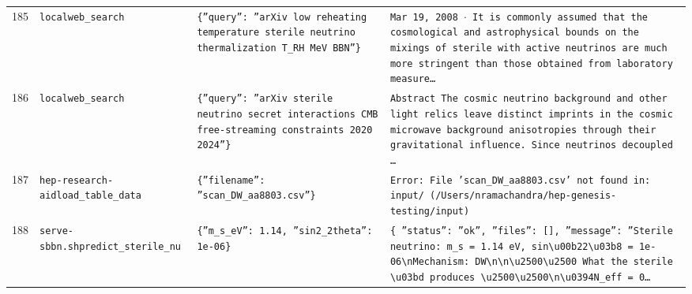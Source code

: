 \documentclass[11pt,a4paper]{article}
\begin{document}
\begin{longtable}{@{}p{}p{}p{}p{}@{}}
185 & \texttt{local}\newline\texttt{web\_\allowbreak{}search} & \texttt{\{''query'':\allowbreak{} ''arXiv low reheating temperature sterile neutrino thermalization T\_\allowbreak{}RH MeV BBN''\}\allowbreak{}} & \texttt{Mar 19,\allowbreak{} 2008 $\cdot$ It is commonly assumed that the cosmological and astrophysical bounds on the mixings of sterile with active neutrinos are much more stringent than those obtained from laboratory measure\ldots{}\allowbreak{}} \\
186 & \texttt{local}\newline\texttt{web\_\allowbreak{}search} & \texttt{\{''query'':\allowbreak{} ''arXiv sterile neutrino secret interactions CMB free-streaming constraints 2020 2024''\}\allowbreak{}} & \texttt{Abstract The cosmic neutrino background and other light relics leave distinct imprints in the cosmic microwave background anisotropies through their gravitational influence. Since neutrinos decoupled \ldots{}\allowbreak{}} \\
187 & \texttt{hep-research-aid}\newline\texttt{load\_\allowbreak{}table\_\allowbreak{}data} & \texttt{\{''filename'':\allowbreak{} ''scan\_\allowbreak{}DW\_\allowbreak{}aa8803.csv''\}\allowbreak{}} & \texttt{Error:\allowbreak{} File 'scan\_\allowbreak{}DW\_\allowbreak{}aa8803.csv' not found in:\allowbreak{} input/\allowbreak{} (/\allowbreak{}Users/\allowbreak{}nramachandra/\allowbreak{}hep-genesis-testing/\allowbreak{}input)\allowbreak{}} \\
188 & \texttt{serve-sbbn.sh}\newline\texttt{predict\_\allowbreak{}sterile\_\allowbreak{}nu} & \texttt{\{''m\_\allowbreak{}s\_\allowbreak{}eV'':\allowbreak{} 1.14,\allowbreak{} ''sin2\_\allowbreak{}2theta'':\allowbreak{} 1e-06\}\allowbreak{}} & \texttt{\{   ''status'':\allowbreak{} ''ok'',\allowbreak{}   ''files'':\allowbreak{} []\allowbreak{},\allowbreak{}   ''message'':\allowbreak{} ''Sterile neutrino:\allowbreak{} m\_\allowbreak{}s =\allowbreak{} 1.14 eV,\allowbreak{} sin\textbackslash{}\allowbreak{}u00b22\textbackslash{}\allowbreak{}u03b8 =\allowbreak{} 1e-06\textbackslash{}\allowbreak{}nMechanism:\allowbreak{} DW\textbackslash{}\allowbreak{}n\textbackslash{}\allowbreak{}n\textbackslash{}\allowbreak{}u2500\textbackslash{}\allowbreak{}u2500 What the sterile \textbackslash{}\allowbreak{}u03bd produces \textbackslash{}\allowbreak{}u2500\textbackslash{}\allowbreak{}u2500\textbackslash{}\allowbreak{}n\textbackslash{}\allowbreak{}u0394N\_\allowbreak{}eff =\allowbreak{} 0\ldots{}\allowbreak{}} \\

\end{longtable}
\end{document}
